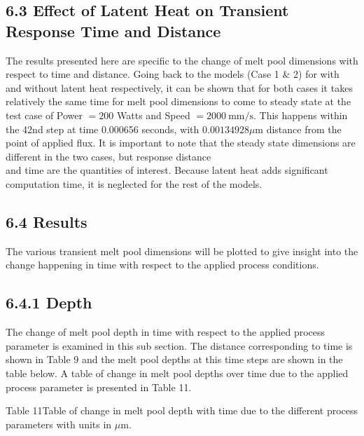 \documentclass[10pt]{article}
\begin{document}
\subsection*{6.3 Effect of Latent Heat on Transient Response Time and Distance}
The results presented here are specific to the change of melt pool dimensions with respect to time and distance. Going back to the models (Case 1 \& 2) for with and without latent heat respectively, it can be shown that for both cases it takes relatively the same time for melt pool dimensions to come to steady state at the test case of Power $=200$ Watts and Speed $=2000 \mathrm{~mm} / \mathrm{s}$. This happens within the 42nd step at time 0.000656 seconds, with $0.00134928 \mu \mathrm{m}$ distance from the point of applied flux. It is important to note that the steady state dimensions are different in the two cases, but response distance\\
and time are the quantities of interest. Because latent heat adds significant computation time, it is neglected for the rest of the models.

\subsection*{6.4 Results}
The various transient melt pool dimensions will be plotted to give insight into the change happening in time with respect to the applied process conditions.

\subsection*{6.4.1 Depth}
The change of melt pool depth in time with respect to the applied process parameter is examined in this sub section. The distance corresponding to time is shown in Table 9 and the melt pool depths at this time steps are shown in the table below. A table of change in melt pool depths over time due to the applied process parameter is presented in Table 11.

Table 11Table of change in melt pool depth with time due to the different process parameters with units in $\mu \mathrm{m}$.
\end{document}

